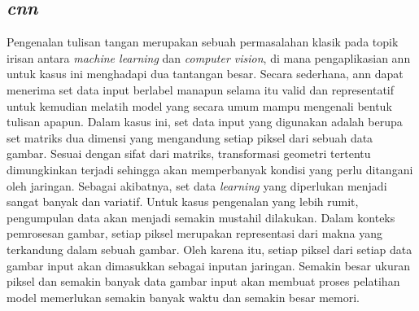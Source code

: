 \subsection{\textit{\acrlong{cnn}}}
Pengenalan tulisan tangan merupakan sebuah permasalahan klasik pada topik irisan antara \textit{machine learning} dan \textit{computer vision}, di mana pengaplikasian \acrshort{ann} untuk kasus ini menghadapi dua tantangan besar. Secara sederhana, \acrshort{ann} dapat menerima set data input berlabel manapun selama itu valid dan representatif untuk kemudian melatih model yang secara umum mampu mengenali bentuk tulisan apapun. Dalam kasus ini, set data input yang digunakan adalah berupa set matriks dua dimensi yang mengandung setiap piksel dari sebuah data gambar. Sesuai dengan sifat dari matriks, transformasi geometri tertentu dimungkinkan terjadi sehingga akan memperbanyak kondisi yang perlu ditangani oleh jaringan. Sebagai akibatnya, set data \textit{learning} yang diperlukan menjadi sangat banyak dan variatif. Untuk kasus pengenalan yang lebih rumit, pengumpulan data akan menjadi semakin mustahil dilakukan. Dalam konteks pemrosesan gambar, setiap piksel merupakan representasi dari makna yang terkandung dalam sebuah gambar. Oleh karena itu, setiap piksel dari setiap data gambar input akan dimasukkan sebagai inputan jaringan. Semakin besar ukuran piksel dan semakin banyak data gambar input akan membuat proses pelatihan model memerlukan semakin banyak waktu dan semakin besar memori.

